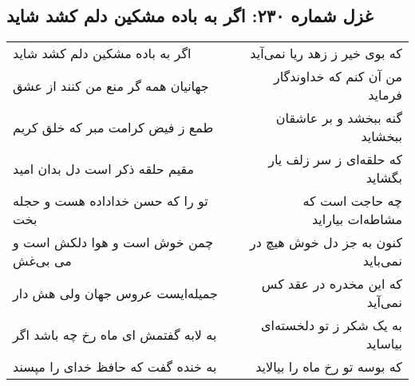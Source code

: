 \begin{center}
\section*{غزل شماره ۲۳۰: اگر به باده مشکین دلم کشد شاید}
\label{sec:sh230}
\begin{longtable}{l p{0.5cm} r}
اگر به باده مشکین دلم کشد شاید
&&
که بوی خیر ز زهد ریا نمی‌آید
\\
جهانیان همه گر منع من کنند از عشق
&&
من آن کنم که خداوندگار فرماید
\\
طمع ز فیض کرامت مبر که خلق کریم
&&
گنه ببخشد و بر عاشقان ببخشاید
\\
مقیم حلقه ذکر است دل بدان امید
&&
که حلقه‌ای ز سر زلف یار بگشاید
\\
تو را که حسن خداداده هست و حجله بخت
&&
چه حاجت است که مشاطه‌ات بیاراید
\\
چمن خوش است و هوا دلکش است و می بی‌غش
&&
کنون به جز دل خوش هیچ در نمی‌باید
\\
جمیله‌ایست عروس جهان ولی هش دار
&&
که این مخدره در عقد کس نمی‌آید
\\
به لابه گفتمش ای ماه رخ چه باشد اگر
&&
به یک شکر ز تو دلخسته‌ای بیاساید
\\
به خنده گفت که حافظ خدای را مپسند
&&
که بوسه تو رخ ماه را بیالاید
\\
\end{longtable}
\end{center}
